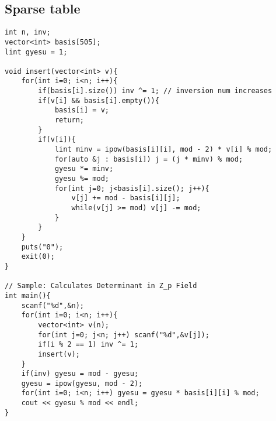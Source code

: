 \documentclass[landscape, 8pt, a4paper, oneside, twocolumn]{extarticle}
\begin{document}
\subsection{Sparse table}
\begin{verbatim}
int n, inv;
vector<int> basis[505];
lint gyesu = 1;

void insert(vector<int> v){
	for(int i=0; i<n; i++){
		if(basis[i].size()) inv ^= 1; // inversion num increases
		if(v[i] && basis[i].empty()){
			basis[i] = v;
			return;
		}
		if(v[i]){
			lint minv = ipow(basis[i][i], mod - 2) * v[i] % mod;
			for(auto &j : basis[i]) j = (j * minv) % mod;
			gyesu *= minv;
			gyesu %= mod;
			for(int j=0; j<basis[i].size(); j++){
				v[j] += mod - basis[i][j];
				while(v[j] >= mod) v[j] -= mod;
			}
		}
	}
	puts("0");
	exit(0);
}

// Sample: Calculates Determinant in Z_p Field
int main(){
	scanf("%d",&n);
	for(int i=0; i<n; i++){
		vector<int> v(n);
		for(int j=0; j<n; j++) scanf("%d",&v[j]);
		if(i % 2 == 1) inv ^= 1;
		insert(v);
	}
	if(inv) gyesu = mod - gyesu;
	gyesu = ipow(gyesu, mod - 2);
	for(int i=0; i<n; i++) gyesu = gyesu * basis[i][i] % mod;
	cout << gyesu % mod << endl; 
}
\end{verbatim}
\end{document}
